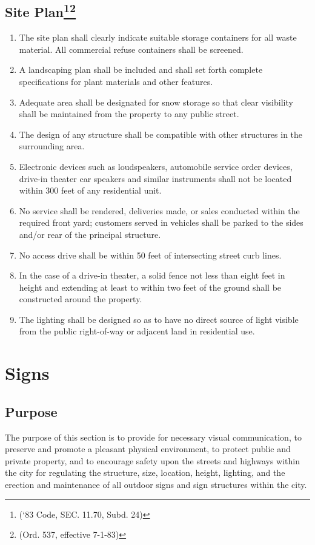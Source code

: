 \subsection{Site Plan\footnote{(‘83 Code, SEC. 11.70, Subd. 24)}\footnote{(Ord. 537, effective 7-1-83)}}
\begin{enumerate}[{\indent}1)]
    \item The site plan shall clearly indicate suitable storage containers for all waste material.  All commercial refuse containers shall be screened.
    \item A landscaping plan shall be included and shall set forth complete specifications for plant materials and other features.
    \item Adequate area shall be designated for snow storage so that clear visibility shall be maintained from the property to any public street.
    \item The design of any structure shall be compatible with other structures in the surrounding area.
    \item Electronic devices such as loudspeakers, automobile service order devices, drive-in theater car speakers and similar instruments shall not be located within 300 feet of any residential unit.
    \item No service shall be rendered, deliveries made, or sales conducted within the required front yard; customers served in vehicles shall be parked to the sides and/or rear of the principal structure.
    \item No access drive shall be within 50 feet of intersecting street curb lines.
    \item In the case of a drive-in theater, a solid fence not less than eight feet in height and extending at least to within two feet of the ground shall be constructed around the property.
    \item The lighting shall be designed so as to have no direct source of light visible from the public right-of-way or adjacent land in residential use.
\end{enumerate}

\section{Signs}
\subsection{Purpose}
The purpose of this section is to provide for necessary visual communication, to preserve and promote a pleasant physical environment, to protect public and private property, and to encourage safety upon the streets and highways within the city for regulating the structure, size, location, height, lighting, and the erection and maintenance of all outdoor signs and sign structures within the city.
